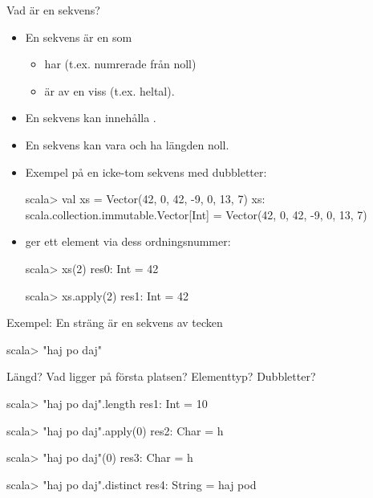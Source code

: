 

\ifkompendium\else
{
  \frame[plain]{\centering\Huge\textbf{\color{pink}{ORDNINGEN}\\SPELAR\\ROLL}}
}
\fi


\begin{Slide}{Vad är en sekvens?}  
\begin{itemize}
\item En sekvens är en  som
  \begin{itemize}
   \item har  (t.ex. numrerade från noll)
   \item är av en viss  (t.ex. heltal).
  \end{itemize}
  \pause
\item En sekvens kan innehålla .
\item En sekvens kan vara  och ha längden noll.
\item Exempel på en icke-tom sekvens med dubbletter:
\begin{REPLnonum}
scala> val xs = Vector(42, 0, 42, -9, 0, 13, 7)
xs: scala.collection.immutable.Vector[Int] =
  Vector(42, 0, 42, -9, 0, 13, 7)
\end{REPLnonum}
\pause
\item {} ger ett element via dess ordningsnummer:
\begin{REPLnonum}
scala> xs(2)
res0: Int = 42

scala> xs.apply(2)
res1: Int = 42
\end{REPLnonum}
\end{itemize}
\end{Slide}

\begin{Slide}{Exempel: En sträng är en sekvens av tecken}
\begin{REPLnonum}
scala> "haj po daj"
\end{REPLnonum}
Längd? 
Vad ligger på första platsen?
Elementtyp?
Dubbletter?
\pause
\begin{REPLnonum}
scala> "haj po daj".length
res1: Int = 10

scala> "haj po daj".apply(0)
res2: Char = h

scala> "haj po daj"(0)
res3: Char = h

scala> "haj po daj".distinct
res4: String = haj pod
\end{REPLnonum}

\end{Slide}


